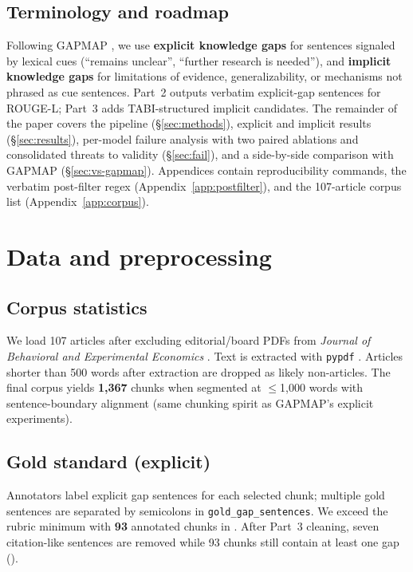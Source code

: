 \documentclass{article}
\begin{document}
\subsection{Terminology and roadmap}
Following GAPMAP \citep{salem2025gapmap}, we use \textbf{explicit knowledge gaps} for sentences signaled by lexical cues (``remains unclear'', ``further research is needed''), and \textbf{implicit knowledge gaps} for limitations of evidence, generalizability, or mechanisms not phrased as cue sentences. Part~2 outputs verbatim explicit-gap sentences for ROUGE-L; Part~3 adds TABI-structured implicit candidates. The remainder of the paper covers the pipeline (\S\ref{sec:methods}), explicit and implicit results (\S\ref{sec:results}), per-model failure analysis with two paired ablations and consolidated threats to validity (\S\ref{sec:fail}), and a side-by-side comparison with GAPMAP (\S\ref{sec:vs-gapmap}). Appendices contain reproducibility commands, the verbatim post-filter regex (Appendix~\ref{app:postfilter}), and the 107-article corpus list (Appendix~\ref{app:corpus}).

\section{Data and preprocessing}

\subsection{Corpus statistics}
We load 107 articles after excluding editorial/board PDFs from \emph{Journal of Behavioral and Experimental Economics} \citep{beee2026}. Text is extracted with \texttt{pypdf} \citep{pypdf}. Articles shorter than 500 words after extraction are dropped as likely non-articles. The final corpus yields \textbf{1{,}367} chunks when segmented at $\le$1{,}000 words with sentence-boundary alignment (same chunking spirit as GAPMAP's explicit experiments).

\subsection{Gold standard (explicit)}
Annotators label explicit gap sentences for each selected chunk; multiple gold sentences are separated by semicolons in \texttt{gold\_gap\_sentences}. We exceed the rubric minimum with \textbf{93} annotated chunks in . After Part~3 cleaning, seven citation-like sentences are removed while 93 chunks still contain at least one gap ().
\end{document}
